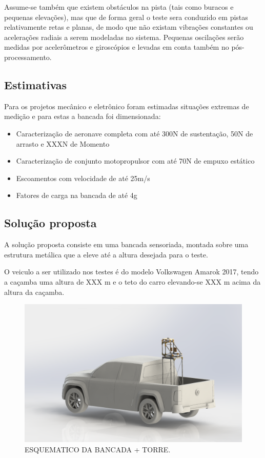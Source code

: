 Assume-se também que existem obstáculos na pista (tais como buracos e pequenas elevações), mas que de forma geral o teste sera conduzido em pistas relativamente retas e planas, de modo que não existam vibrações constantes ou acelerações radiais a serem modeladas no sistema. Pequenas oscilações serão medidas por acelerômetros e giroscópios e levadas em conta também no pós-processamento.

\subsection{Estimativas}

Para os projetos mecânico e eletrônico foram estimadas situações extremas de medição e para estas a bancada foi dimensionada:

\begin{itemize}
    \item Caracterização de aeronave completa com até 300N de sustentação, 50N de arrasto e XXXN de Momento
    \item Caracterização de conjunto motopropulsor com até 70N de empuxo estático
    \item Escoamentos com velocidade de até 25m/s
    \item Fatores de carga na bancada de até 4g
\end{itemize}

\subsection{Solução proposta}

A solução proposta consiste em uma bancada sensoriada, montada sobre uma estrutura metálica que a eleve até a altura desejada para o teste.

O veiculo a ser utilizado nos testes é do modelo Volkswagen Amarok 2017, tendo a caçamba uma altura de XXX m e o teto do carro elevando-se XXX m acima da altura da caçamba.

\begin{figure}[!ht]
    \centering
    \includegraphics[width=.8\linewidth]{figuras/renders/bancada_no_carro_perspectiva.png}
    \caption{ESQUEMATICO DA BANCADA + TORRE\cite{autor}.}
    \label{fig:placeholder}
\end{figure}

